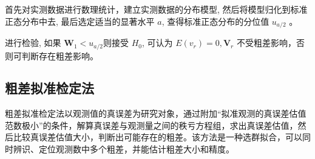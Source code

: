 \documentclass[12pt,hyperref,a4paper,UTF8]{ctexart}
\begin{document}
首先对实测数据进行数理统计，建立实测数据的分布模型, 然后将模型归化到标准正态分布中去, 最后选定适当的显著水平 $a$, 查得标准正态分布的分位值 $u_{a/ 2}$ 。

进行检验, 如果 $\mathbf{W}_1<u_{a / 2}$则接受 $H_0$, 可认为 $E\left(v_r\right)=0, \mathbf{V}_r$ 不受粗差影响，否则可判断存在粗差影响。

\subsection{粗差拟准检定法}

粗差拟准检定法以观测值的真误差为研究对象，通过附加“拟准观测的真误差估值范数极小”的条件，解算真误差与观测量之间的秩亏方程组，求出真误差估值，然后比较真误差估值大小，判断出可能存在的粗差\cite{2004041259nh}。该方法是一种选群拟合，可以同时辨识、定位观测数中多个粗差，并能估计粗差大小和精度。
\end{document}

